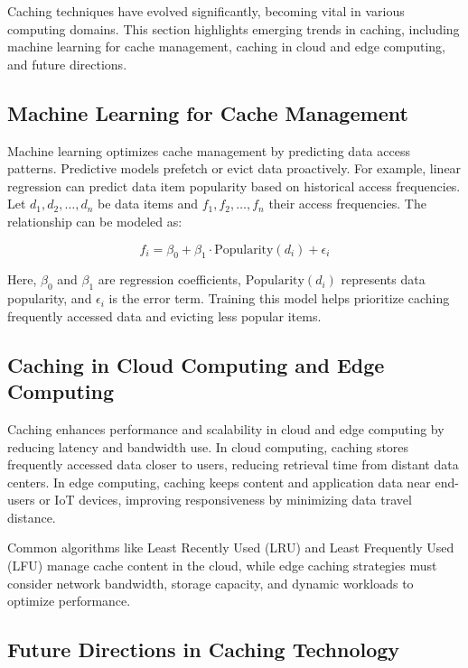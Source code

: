 \documentclass[12pt]{book} %
\begin{document}
Caching techniques have evolved significantly, becoming vital in various computing domains. This section highlights emerging trends in caching, including machine learning for cache management, caching in cloud and edge computing, and future directions.

\subsection{Machine Learning for Cache Management}

Machine learning optimizes cache management by predicting data access patterns. Predictive models prefetch or evict data proactively. For example, linear regression can predict data item popularity based on historical access frequencies. Let \(d_1, d_2, \ldots, d_n\) be data items and \(f_1, f_2, \ldots, f_n\) their access frequencies. The relationship can be modeled as:

\[
f_i = \beta_0 + \beta_1 \cdot \text{Popularity}(d_i) + \epsilon_i
\]

Here, \(\beta_0\) and \(\beta_1\) are regression coefficients, \(\text{Popularity}(d_i)\) represents data popularity, and \(\epsilon_i\) is the error term. Training this model helps prioritize caching frequently accessed data and evicting less popular items.

\subsection{Caching in Cloud Computing and Edge Computing}

Caching enhances performance and scalability in cloud and edge computing by reducing latency and bandwidth use. In cloud computing, caching stores frequently accessed data closer to users, reducing retrieval time from distant data centers. In edge computing, caching keeps content and application data near end-users or IoT devices, improving responsiveness by minimizing data travel distance.

Common algorithms like Least Recently Used (LRU) and Least Frequently Used (LFU) manage cache content in the cloud, while edge caching strategies must consider network bandwidth, storage capacity, and dynamic workloads to optimize performance.

\subsection{Future Directions in Caching Technology}
\end{document}
